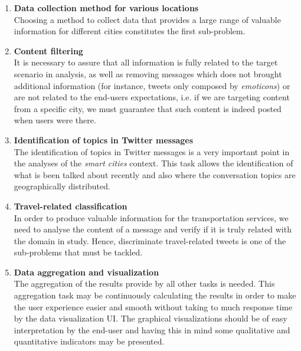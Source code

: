 \begin{enumerate}
	\item \textbf{Data collection method for various locations}\\
	Choosing a method to collect data that provides a large range of valuable information for different cities constitutes the first sub-problem.
	
	\item \textbf{Content filtering}\\
	It is necessary to assure that all information is fully related to the target scenario in analysis, as well as removing messages which does not brought additional information (for instance, tweets only composed by \textit{emoticons}) or are not related to the end-users expectations, i.e. if we are targeting content from a specific city, we must guarantee that such content is indeed posted when users were there.
	
	\item \textbf{Identification of topics in Twitter messages}\\
	The identification of topics in Twitter messages is a very important point in the analyses of the \textit{smart cities} context. This task allows the identification of what is been talked about recently and also where the conversation topics are geographically distributed.
	
	\item \textbf{Travel-related classification}\\
	In order to produce valuable information for the transportation services, we need to analyse the content of a message and verify if it is truly related with the domain in study. Hence, discriminate travel-related tweets is one of the sub-problems that must be tackled.
	
	\item \textbf{Data aggregation and visualization}\\
	The aggregation of the results provide by all other tasks is needed. This aggregation task may be continuously calculating the results in order to make the user experience easier and smooth without taking to much response time by the data visualization UI. The graphical visualizations should be of easy interpretation by the end-user and having this in mind some qualitative and quantitative indicators may be presented.
\end{enumerate}

